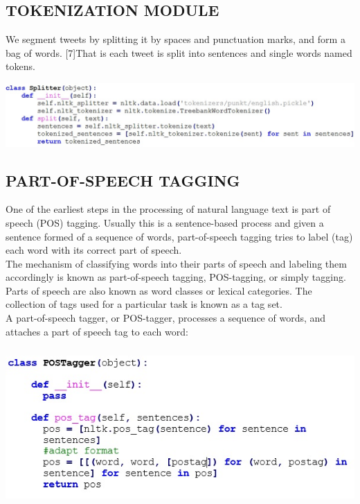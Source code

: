 \documentclass[a4paper,12pt]{report}
\begin{document}
\subsection{TOKENIZATION  MODULE}
\hspace*{\parindent}We segment tweets by splitting it by spaces and punctuation marks, and form a bag of words. [7]That is each tweet is split into sentences and single words named tokens.
\begin{center}
	\includegraphics[height=3.2 cm]{images/SplitterModule.jpg}
\end{center}

\subsection{PART-OF-SPEECH TAGGING}
One of the earliest steps in the processing of natural language text is part of speech (POS) tagging. Usually this is a sentence-based process and given a sentence formed of a sequence of words, part-of-speech tagging tries to label (tag) each word with its correct part of speech.\\
\hspace*{\parindent}The mechanism of classifying words into their parts of speech and labeling them accordingly is known as part-of-speech tagging, POS-tagging, or simply tagging. Parts of speech are also known as word classes or lexical categories. The collection of tags used for a particular task is known as a tag set.\\
\hspace*{\parindent}A part-of-speech tagger, or POS-tagger, processes a sequence of words, and attaches a part of speech tag to each word:
\begin{center}
	\includegraphics[height=6cm]{images/codeposttagging.jpg}
\end{center}
\end{document}

